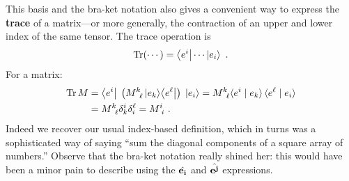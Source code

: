 This basis and the bra-ket notation also gives a convenient way to express the \textbf{trace} of a matrix---or more generally, the contraction of an upper and lower index of the same tensor. The trace operation is
\begin{align}
    \operatorname{\textnormal{Tr}}(\cdots) = 
    \left\langle e^i\right| \cdots \left|e_i\right\rangle \ .
\end{align}
For a matrix:
\begin{align}
    \Tr M &= \bra{e^i}\; \left(M\aij{k}{\ell}\ket{e_k}\!\bra{e^\ell}\right) \;\ket{e_i}
    = M\aij{k}{\ell}  
    \la {e^i} \mid {e_k}\ra \, \la {e^\ell} \mid {e_i} \ra 
    \\
    &= 
    M\aij{k}{\ell}  \delta^i_k \delta^\ell_i 
    =  M\aij{i}{i} \ .
\end{align}
Indeed we recover our usual index-based definition, which in turns was a sophisticated way of saying ``sum the diagonal components of a square array of numbers.'' Observe that the bra-ket notation really shined her: this would have been a minor pain to describe using the $\hat{\mathbf{e_i}}$ and $\hat{\mathbf{e^j}}$ expressions.


